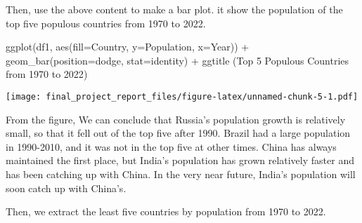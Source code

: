 \documentclass[
]{article}
\newenvironment{Shaded}{\begin{snugshade}}{\end{snugshade}}
\newcommand{\AttributeTok}[1]{\textcolor[rgb]{0.77,0.63,0.00}{#1}}
\newcommand{\FunctionTok}[1]{\textcolor[rgb]{0.00,0.00,0.00}{#1}}
\newcommand{\NormalTok}[1]{#1}
\newcommand{\SpecialCharTok}[1]{\textcolor[rgb]{0.00,0.00,0.00}{#1}}
\newcommand{\StringTok}[1]{\textcolor[rgb]{0.31,0.60,0.02}{#1}}
\begin{document}
Then, use the above content to make a bar plot. it show the population
of the top five populous countries from 1970 to 2022.

\begin{Shaded}
\begin{Highlighting}[]
\FunctionTok{ggplot}\NormalTok{(df1, }\FunctionTok{aes}\NormalTok{(}\AttributeTok{fill=}\NormalTok{Country, }\AttributeTok{y=}\NormalTok{Population, }\AttributeTok{x=}\NormalTok{Year)) }\SpecialCharTok{+} 
  \FunctionTok{geom\_bar}\NormalTok{(}\AttributeTok{position=}\StringTok{\textquotesingle{}dodge\textquotesingle{}}\NormalTok{, }\AttributeTok{stat=}\StringTok{\textquotesingle{}identity\textquotesingle{}}\NormalTok{) }\SpecialCharTok{+}
  \FunctionTok{ggtitle}\NormalTok{ (}\StringTok{\textquotesingle{}Top 5 Populous Countries from 1970 to 2022\textquotesingle{}}\NormalTok{)}
\end{Highlighting}
\end{Shaded}

\texttt{[image: final\_project\_report\_files/figure-latex/unnamed-chunk-5-1.pdf]}

From the figure, We can conclude that Russia's population growth is
relatively small, so that it fell out of the top five after 1990. Brazil
had a large population in 1990-2010, and it was not in the top five at
other times. China has always maintained the first place, but India's
population has grown relatively faster and has been catching up with
China. In the very near future, India's population will soon catch up
with China's.

Then, we extract the least five countries by population from 1970 to
2022.
\end{document}

